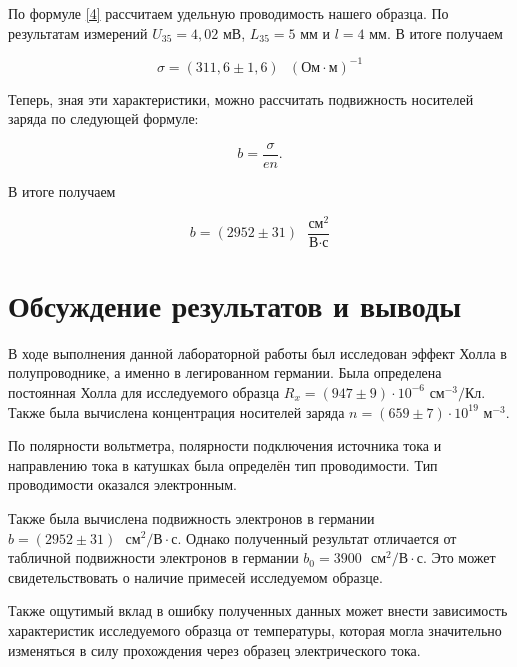 \documentclass[a4paper,12pt]{article} %
\begin{document}
По формуле \eqref{4} рассчитаем удельную проводимость нашего образца. По результатам измерений $ U_{35} = 4,02 $ мВ, $ L_{35} = 5 $ мм и $ l = 4 $ мм. В итоге получаем 

\begin{equation}\label{12}
\boxed{\sigma = (311,6\pm1,6)\text{ } (\text{Ом}\cdot\text{м})^{-1}}
\end{equation}

Теперь, зная эти характеристики, можно рассчитать подвижность носителей заряда по следующей формуле:

\begin{equation}\label{13}
b=\frac{\sigma}{en}.
\end{equation}


В итоге получаем

\begin{equation}\label{14}
\boxed{b = (2952\pm31) \text{ } \frac{\text{см}^2}{\text{В}\cdot\text{с}}}
\end{equation}

\section{Обсуждение результатов и выводы}

В ходе выполнения данной лабораторной работы был исследован эффект Холла в полупроводнике, а именно в легированном германии. Была определена постоянная Холла для исследуемого образца $ R_x = (947\pm9) \cdot 10^{-6} \text{ см}^{-3}/\text{Кл} $. Также была вычислена концентрация носителей заряда $ n = (659\pm7) \cdot 10^{19} \text{ м}^{-3}. $

По полярности вольтметра, полярности подключения источника тока и направлению тока в катушках была определён тип проводимости. Тип проводимости оказался электронным.

Также была вычислена подвижность электронов в германии $ b = (2952\pm31) \text{ } \text{см}^2/\text{В}\cdot\text{с} $. Однако полученный результат отличается от табличной подвижности электронов в германии $ b_0 = 3900 \text{ } \text{см}^2/\text{В}\cdot\text{с} $. Это может свидетельствовать о наличие примесей исследуемом образце.

Также ощутимый вклад в ошибку полученных данных может внести зависимость характеристик исследуемого образца от температуры, которая могла значительно изменяться в силу прохождения через образец электрического тока.
\end{document}
